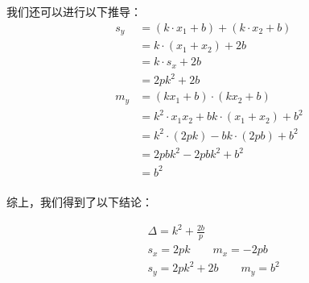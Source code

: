\documentclass[UTF8]{ctexart}
\begin{document}
    我们还可以进行以下推导：
    \begin{align}
        s_y
        &=(k\cdot x_1+b)+(k\cdot x_2+b)\\[3mm]
        &=k\cdot(x_1+x_2)+2b\\[3mm]
        &=k\cdot s_x+2b\\[3mm]
        &=2pk^2+2b\\[6mm]
        m_y
        &=(kx_1+b)\cdot(kx_2+b)\\[3mm]
        &=k^2\cdot x_1x_2+bk\cdot(x_1+x_2)+b^2\\[3mm]
        &=k^2\cdot(2pk)-bk\cdot(2pb)+b^2\\[3mm]
        &=2pbk^2-2pbk^2+b^2\\[3mm]
        &=b^2
    \end{align}\\
    综上，我们得到了以下结论：
    \begin{large}
        \begin{align*}
            &\Delta=k^2+\frac{2b}{p}\\[4mm]
            &s_x=2pk\qquad
            m_x=-2pb\\[6mm]
            &s_y=2pk^2+2b\qquad
            m_y=b^2
        \end{align*}
    \end{large}

\newpage
\end{document}
